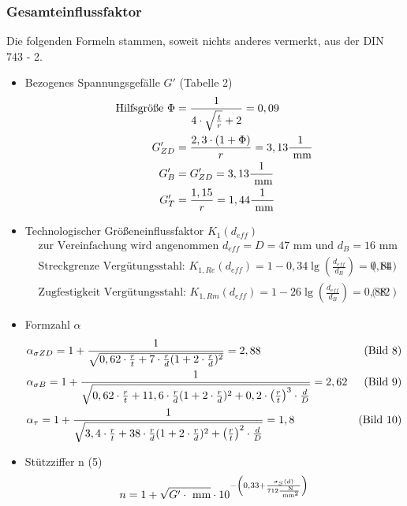 \subsubsection{Gesamteinflussfaktor}
Die folgenden Formeln stammen, soweit nichts anderes vermerkt, aus der DIN 743 - 2.
\begin{itemize}
	\item Bezogenes Spannungsgefälle $G'$ \hfill (Tabelle 2)
	\begin{align*}
		\text{Hilfsgröße } \Phi &= \frac{1}{4 \cdot \sqrt{\frac{t}{r}} +2} = 0,09 \\
		G'_{ZD} &= \frac{2,3 \cdot (1+\Phi)}{r} = 3,13 \frac{1}{\text{ mm}} \\
		G'_{B}&= G'_{ZD}  =3,13 \frac{1}{\text{ mm}} \\
		G'_{T}&= \frac{1,15}{r} = 1,44\frac{1}{\text{ mm}} 
	\end{align*}
	\item Technologischer Größeneinflussfaktor $K_1 (d_{eff})$ 
	\begin{align*}
		&\text{zur Vereinfachung wird angenommen } d_{eff} = D =47 \text{ mm und } d_B = 16 \text{ mm} \\ 
		&\text{Streckgrenze Vergütungsstahl: }K_{1,Re}(d_{eff}) = 1 - 0,34 \lg \left( \frac{d_{eff}}{d_B} \right) = 0,84  &(14) \\
		&\text{Zugfestigkeit Vergütungsstahl: } K_{1,Rm}(d_{eff}) = 1 - 26 \lg \left( \frac{d_{eff}}{d_B} \right) = 0,88  &(12) 
	\end{align*}
	\item Formzahl $\alpha$
	\begin{align*}
		&\alpha_{\sigma ZD} = 1 + \frac{1}{\sqrt{0,62 \cdot \frac{r}{t} + 7 \cdot \frac{r}{d} (1+2 \cdot \frac{r}{d})^2}} = 2,88 & \text{(Bild 8)} \\
		&\alpha_{\sigma B} = 1 + \frac{1}{\sqrt{0,62 \cdot \frac{r}{t} + 11,6 \cdot \frac{r}{d} (1+2 \cdot \frac{r}{d})^2 + 0,2 \cdot \left( \frac{r}{t} \right) ^3 \cdot \frac{d}{D}}} = 2,62 & \text{(Bild 9)} \\
		&\alpha_{\tau} = 1 + \frac{1}{\sqrt{3,4 \cdot \frac{r}{t} + 38 \cdot \frac{r}{d} (1+2 \cdot \frac{r}{d})^2 + \left( \frac{r}{t} \right) ^2 \cdot \frac{d}{D}}} = 1,8  & \text{(Bild 10)} 
	\end{align*}
	\item Stützziffer n \hfill (5)
	\begin{align*}
		n&= 1 + \sqrt{G' \x \text{ mm}} \x 10 ^{-\left( 0,33 + \frac{\sigma_S (d)}{712\frac{\text{ N}}{\text{ mm}^2}} \right)} \\

\end{align*}
\end{itemize}
